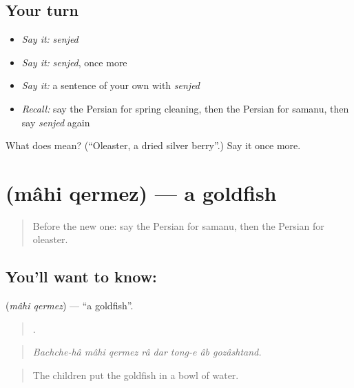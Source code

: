 \subsection*{Your turn}
\begin{itemize}
\raggedright
  \item \emph{Say it:} \emph{senjed}
  \item \emph{Say it:} \emph{senjed}, once more
  \item \emph{Say it:} a sentence of your own with \emph{senjed}
  \item \emph{Recall:} say the Persian for spring cleaning, then the Persian for samanu, then say \emph{senjed} again
\end{itemize}

\begin{tcolorbox}[breakable,colback=teal!4,colframe=teal!35!black,title={Before you move on}]
What does  mean? (\textquotedblleft{}Oleaster, a dried silver berry\textquotedblright{}.) Say it once more.
\end{tcolorbox}
\section[\texorpdfstring{\fa{ماهی} \fa{قرمز} (mâhi qermez)}{ماهی قرمز (mâhi qermez)}]{  (mâhi qermez) — a goldfish}

\label{lesson:FA-C339-mahi-qermez}



\begin{quote}
Before the new one: say the Persian for samanu, then the Persian for oleaster.
\end{quote}

\subsection*{You'll want to know:  }
\textbf{ } (\emph{mâhi qermez}) — \textquotedblleft{}a goldfish\textquotedblright{}.

\begin{quote}
        .
\end{quote}

\begin{quote}
\emph{Bachche-hâ mâhi qermez râ dar tong-e âb gozâshtand.}
\end{quote}

\begin{quote}
The children put the goldfish in a bowl of water.
\end{quote}

